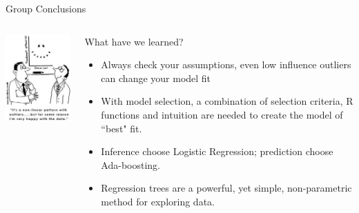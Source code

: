 \documentclass[table]{beamer}\usepackage[]{graphicx}\usepackage[]{color}
\begin{document}
\begin{frame}{Group Conclusions}
\begin{columns}[t]
\begin{column}[t]{4cm}

\includegraphics[width=\textwidth]{happy}

\end{column}


\begin{column}[t]{8cm}
What have we learned? 

\begin{itemize}
  \item Always check your assumptions, even low influence outliers can change your model fit
  \item With model selection, a combination of selection criteria, R functions and intuition are needed to create the model of ``best" fit. 
  \item Inference choose Logistic Regression; prediction choose Ada-boosting.
  \item Regression trees are a powerful, yet simple, non-parametric method for exploring data.
\end{itemize}
\end{column}
\end{columns}
\end{frame}

\end{document}
